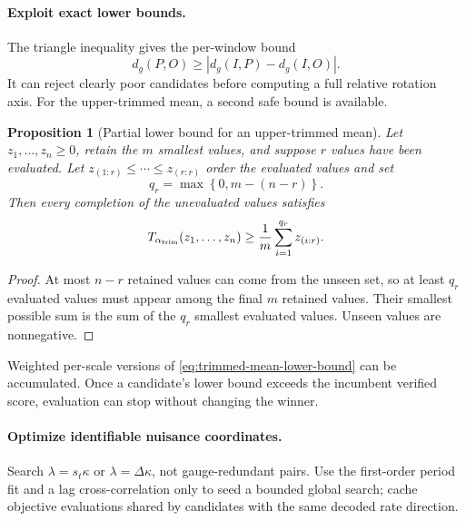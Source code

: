 \documentclass[11pt]{article}
\newtheorem{proposition}[theorem]{Proposition}
\newcommand{\abs}[1]{\left\lvert #1 \right\rvert}
\newcommand{\set}[1]{\left\{ #1 \right\}}
\begin{document}
    \paragraph{Exploit exact lower bounds.}
    The triangle inequality gives the per-window bound
    \begin{equation}
        d_g(P,O)\ge\abs{d_g(I,P)-d_g(I,O)}.
        \label{eq:angle-only-lower-bound}
    \end{equation}
    It can reject clearly poor candidates before computing a full relative rotation axis.
    For the upper-trimmed mean, a second safe bound is available.

    \begin{proposition}[Partial lower bound for an upper-trimmed mean]
Let $z_1,\ldots,z_n\ge0$, retain the $m$ smallest values, and suppose $r$ values have
been evaluated. Let $z_{(1:r)}\le\cdots\le z_{(r:r)}$ order the evaluated values and set
\begin{equation}
    q_r=\max\set{0,m-(n-r)}.
\end{equation}
Then every completion of the unevaluated values satisfies
\begin{equation}
    T_{\alpha_{\rm trim}}(z_1,\ldots,z_n)
    \ge
    \frac{1}{m}\sum_{i=1}^{q_r}z_{(i:r)}.
    \label{eq:trimmed-mean-lower-bound}
\end{equation}
    \end{proposition}
    \begin{proof}
        At most $n-r$ retained values can come from the unseen set, so at least $q_r$ evaluated
        values must appear among the final $m$ retained values. Their smallest possible sum is
        the sum of the $q_r$ smallest evaluated values. Unseen values are nonnegative.
    \end{proof}
    Weighted per-scale versions of \eqref{eq:trimmed-mean-lower-bound} can be accumulated.
    Once a candidate's lower bound exceeds the incumbent verified score, evaluation can stop
    without changing the winner.

    \paragraph{Optimize identifiable nuisance coordinates.}
    Search $\lambda=s_t\kappa$ or $\lambda=\Delta\kappa$, not gauge-redundant pairs. Use the
    first-order period fit and a lag cross-correlation only to seed a bounded global search;
    cache objective evaluations shared by candidates with the same decoded rate direction.
\end{document}
